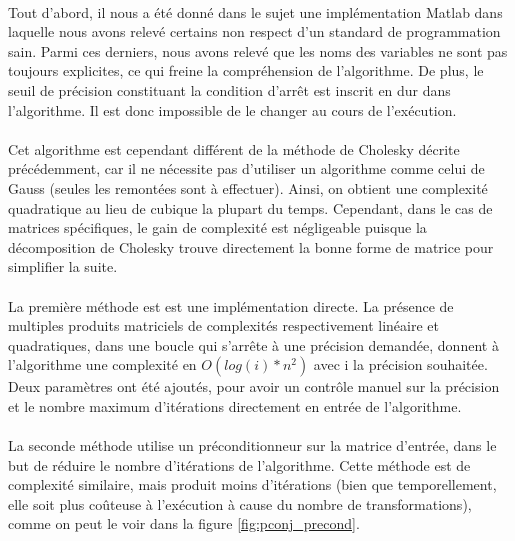 \documentclass{article}
\begin{document}
\paragraph{}
    Tout d'abord, il nous a été donné dans le sujet une implémentation Matlab dans laquelle nous avons relevé certains non respect d'un standard de programmation sain. Parmi ces derniers, nous avons relevé que les noms des variables ne sont pas toujours explicites, ce qui freine la compréhension de l'algorithme. De plus, le seuil de précision constituant la condition d'arrêt est inscrit en dur dans l'algorithme. Il est donc impossible de le changer au cours de l'exécution.
    
\paragraph{}
    Cet algorithme est cependant différent de la méthode de Cholesky décrite précédemment, car il ne nécessite pas d'utiliser un algorithme comme celui de Gauss (seules les remontées sont à effectuer). Ainsi, on obtient une complexité quadratique au lieu de cubique la plupart du temps. Cependant, dans le cas de matrices spécifiques, le gain de complexité est négligeable puisque la décomposition de Cholesky trouve directement la bonne forme de matrice pour simplifier la suite.

\paragraph{}
    La première méthode est est une implémentation directe. La présence de multiples produits matriciels de complexités respectivement linéaire et quadratiques, dans une boucle qui s'arrête à une précision demandée, donnent à l'algorithme une complexité en $O(log(i)*n^2)$ avec i la précision souhaitée. Deux paramètres ont été ajoutés, pour avoir un contrôle manuel sur la précision et le nombre maximum d'itérations directement en entrée de l'algorithme. 
    
\paragraph{}
    La seconde méthode utilise un préconditionneur sur la matrice d'entrée, dans le but de réduire le nombre d'itérations de l'algorithme. Cette méthode est de complexité similaire, mais produit moins d'itérations (bien que temporellement, elle soit plus coûteuse à l'exécution à cause du nombre de transformations), comme on peut le voir dans la figure \ref{fig:pconj_precond}. 
    
\end{document}
